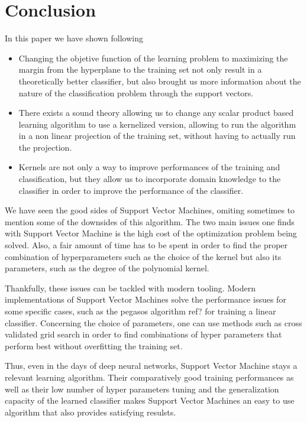 \section{Conclusion}

In this paper we have shown following

\begin{itemize}
\item Changing the objetive function of the learning problem to maximizing the margin from the hyperplane to the training set not only result in a theoretically better classifier, but also brought us more information about the nature of the classification problem through the support vectors.
\item There exists a sound theory allowing us to change any scalar product based learning algorithm to use a kernelized version, allowing to run the algorithm in a non linear projection of the training set, without having to actually run the projection.
\item  Kernels are not only a way to improve performances of the training and classification, but they allow us to incorporate domain knowledge to the classifier in order to improve the performance of the classifier.
\end{itemize}

We have seen the good sides of Support Vector Machines, omiting sometimes to mention some of the downsides of this algorithm. The two main issues one finds with Support Vector Machine is the high cost of the optimization problem being solved. Also, a fair amount of time has to be spent in order to find the proper combination of hyperparameters such as the choice of the kernel but also its parameters, such as the degree of the polynomial kernel.

Thankfully, these issues can be tackled with modern tooling. Modern implementations of Support Vector Machines solve the performance issues for some specific cases, such as the pegasos algorithm \textcolor[rgb]{1,0,0}{ref?} for training a linear classifier. Concerning the choice of parameters, one can use methods such as cross validated grid search in order to find combinations of hyper parameters that perform best without overfitting the training set.

Thus, even in the days of deep neural networks, Support Vector Machine stays a relevant learning algorithm. Their comparatively good training performances as well as their low number of hyper parameters tuning and the generalization capacity of the learned classifier makes Support Vector Machines an easy to use algorithm that also provides satisfying resulsts.

